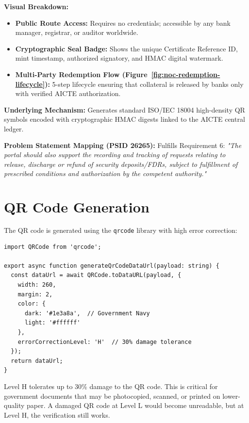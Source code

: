 \documentclass[12pt, a4paper]{report}
\begin{document}
\begin{tcolorbox}[colback=aicteNavy!5!white, colframe=aicteNavy, title={Verification Architecture: Public Zero-Login QR NOC}]
\textbf{Visual Breakdown:}
\begin{itemize}[leftmargin=1.5em]
  \item \textbf{Public Route Access:} Requires no credentials; accessible by any bank manager, registrar, or auditor worldwide.
  \item \textbf{Cryptographic Seal Badge:} Shows the unique Certificate Reference ID, mint timestamp, authorized signatory, and HMAC digital watermark.
  \item \textbf{Multi-Party Redemption Flow (Figure~\ref{fig:noc-redemption-lifecycle}):} 5-step lifecycle ensuring that collateral is released by banks only with verified AICTE authorization.
\end{itemize}

\textbf{Underlying Mechanism:} Generates standard ISO/IEC 18004 high-density QR symbols encoded with cryptographic HMAC digests linked to the AICTE central ledger.

\textbf{Problem Statement Mapping (PSID 26265):} Fulfills Requirement 6: \textit{"The portal should also support the recording and tracking of requests relating to release, discharge or refund of security deposits/FDRs, subject to fulfillment of prescribed conditions and authorization by the competent authority."}
\end{tcolorbox}

\section{QR Code Generation}

The QR code is generated using the \texttt{qrcode} library with high error correction:

\begin{lstlisting}[caption={QR Code Generation Service (qrService.ts)}, label={lst:qr}]
import QRCode from 'qrcode';

export async function generateQrCodeDataUrl(payload: string) {
  const dataUrl = await QRCode.toDataURL(payload, {
    width: 260,
    margin: 2,
    color: {
      dark: '#1e3a8a',  // Government Navy
      light: '#ffffff'
    },
    errorCorrectionLevel: 'H'  // 30% damage tolerance
  });
  return dataUrl;
}
\end{lstlisting}

\begin{designbox}[title={Why Error Correction Level `H'?}]
Level H tolerates up to 30\% damage to the QR code. This is critical for government documents that may be photocopied, scanned, or printed on lower-quality paper. A damaged QR code at Level L would become unreadable, but at Level H, the verification still works.
\end{designbox}
\end{document}
